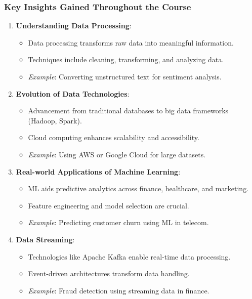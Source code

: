 \documentclass[aspectratio=169]{beamer}
\begin{document}
\begin{frame}[fragile]
    \frametitle{Key Insights Gained Throughout the Course}
    
    \begin{enumerate}
        \item \textbf{Understanding Data Processing}:
            \begin{itemize}
                \item Data processing transforms raw data into meaningful information.
                \item Techniques include cleaning, transforming, and analyzing data.
                \item \textit{Example}: Converting unstructured text for sentiment analysis.
            \end{itemize}
        \item \textbf{Evolution of Data Technologies}:
            \begin{itemize}
                \item Advancement from traditional databases to big data frameworks (Hadoop, Spark).
                \item Cloud computing enhances scalability and accessibility.
                \item \textit{Example}: Using AWS or Google Cloud for large datasets.
            \end{itemize}
        \item \textbf{Real-world Applications of Machine Learning}:
            \begin{itemize}
                \item ML aids predictive analytics across finance, healthcare, and marketing.
                \item Feature engineering and model selection are crucial.
                \item \textit{Example}: Predicting customer churn using ML in telecom.
            \end{itemize}
        \item \textbf{Data Streaming}:
            \begin{itemize}
                \item Technologies like Apache Kafka enable real-time data processing.
                \item Event-driven architectures transform data handling.
                \item \textit{Example}: Fraud detection using streaming data in finance.
            \end{itemize}
    \end{enumerate}
\end{frame}
\end{document}
